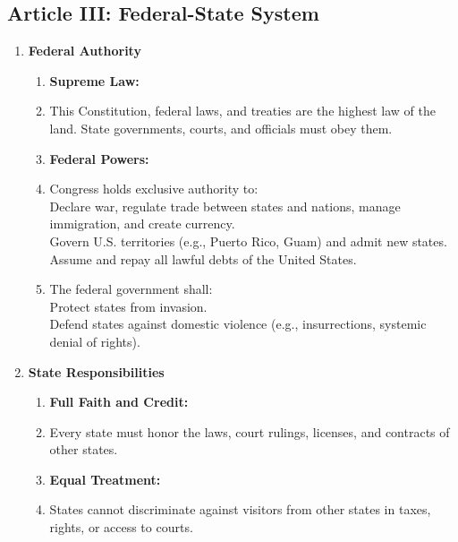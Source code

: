 \documentclass{article}
\begin{document}
\begin{multicols}{2}
\begin{enumerate}[label=\Alph*)]
\begin{enumerate}[label=\Alph*), start=4]
\newpage
\section*{Article III: Federal-State System}

\begin{enumerate}[label=\Alph*), start=8]
    \item \textbf{Federal Authority}
    
    \begin{enumerate}[label=3.1.\arabic*]
        \item[] \textbf{Supreme Law:}
        \item This Constitution, federal laws, and treaties are the highest law of the land. State governments, courts, and officials must obey them.
        
        \item[] \textbf{Federal Powers:}
        \item Congress holds exclusive authority to: \\
        Declare war, regulate trade between states and nations, manage immigration, and create currency. \\
        Govern U.S. territories (e.g., Puerto Rico, Guam) and admit new states. \\
        Assume and repay all lawful debts of the United States.
        
        \item The federal government shall: \\
        Protect states from invasion. \\
        Defend states against domestic violence (e.g., insurrections, systemic denial of rights).
    \end{enumerate}
    
    \item \textbf{State Responsibilities}
    
    \begin{enumerate}[label=3.2.\arabic*]
        \item[] \textbf{Full Faith and Credit:}
        \item Every state must honor the laws, court rulings, licenses, and contracts of other states.
        
        \item[] \textbf{Equal Treatment:}
        \item States cannot discriminate against visitors from other states in taxes, rights, or access to courts.
        

\end{enumerate}
\end{enumerate}
\end{enumerate}
\end{enumerate}
\end{multicols}
\end{document}
